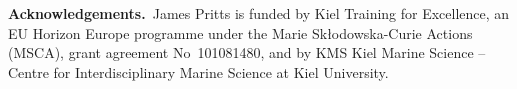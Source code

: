 \documentclass[runningheads]{llncs}
\begin{document}
\vspace{\baselineskip}
{\footnotesize\noindent\textbf{Acknowledgements.}~James Pritts is funded by
	Kiel Training for Excellence, an EU Horizon Europe programme under the
	Marie Sk\l{}odowska-Curie Actions (MSCA), grant agreement
	No~101081480, and by KMS Kiel Marine Science -- Centre for
	Interdisciplinary Marine Science at Kiel University.\par}



\end{document}
